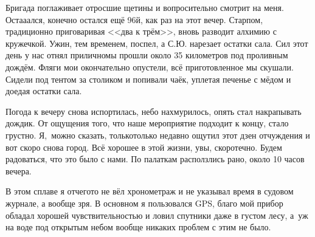 Бригада поглаживает отросшие щетины и вопросительно смотрит на меня. Оста\sdash а\sdash ался, конечно остался ещё 96\sdash й, как раз на этот вечер. Старпом, традиционно приговаривая <<два к трём>>, вновь разводит алхимию с кружечкой. Ужин, тем временем, поспел, а С.Ю. нарезает остатки сала. Сил этот день у нас отнял прилично\mdash мы прошли около 35 километров под проливным дождём. Фляги мои окончательно опустели, всё приготовленное мы скушали. Сидели под тентом за столиком и попивали чаёк, уплетая печенье с мёдом и доедая остатки сала. 

Погода к вечеру снова испортилась, небо нахмурилось, опять стал накрапывать дождик. От ощущения того, что наше мероприятие подходит к концу, стало грустно. Я,~можно сказать, только\sdash только недавно ощутил этот дзен отчуждения и вот скоро снова город. Всё хорошее в этой жизни, увы, скоротечно. Будем радоваться, что это было с нами. По палаткам расползлись рано, около 10 часов вечера. 

В этом сплаве я отчего\sdash то не вёл хронометраж и не указывал время в судовом журнале, а вообще зря. В основном я пользовался GPS, благо мой прибор обладал хорошей чувствительностью и ловил спутники даже в густом лесу, а~уж на воде под открытым небом вообще никаких проблем с этим не было.

\begin{center}
\end{center}
